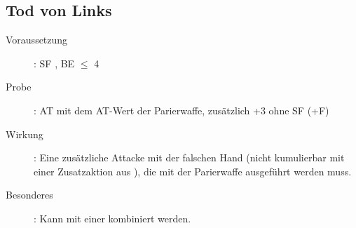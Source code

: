 \subsection{Tod von Links}
\label{aktion.tod_von_links}
\begin{description}
    \item[Voraussetzung]:
        SF , BE\textrm{ ${\leq}$ }4
    \item[Probe]:
        AT mit dem AT-Wert der Parierwaffe, zusätzlich +3 ohne SF  (+F)
    \item[Wirkung]:
        Eine zusätzliche Attacke mit der falschen Hand (nicht kumulierbar mit einer Zusatzaktion aus ), die mit der Parierwaffe ausgeführt werden muss.
    \item[Besonderes]:
        Kann mit einer  kombiniert werden.
\end{description}
